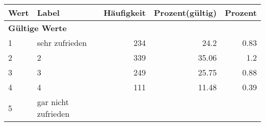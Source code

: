      \begin{longtable}{lXrrr}
     \toprule
     \textbf{Wert} & \textbf{Label} & \textbf{Häufigkeit} & \textbf{Prozent(gültig)} & \textbf{Prozent} \\
     \endhead
     \midrule
     \multicolumn{5}{l}{\textbf{Gültige Werte}}\\

     1 &
     \multicolumn{1}{X}{ sehr zufrieden   } &


       \num{234} &
       \num[round-mode=places,round-precision=2]{24,2} &
         \num[round-mode=places,round-precision=2]{0,83} \\

     2 &
     \multicolumn{1}{X}{ 2   } &


       \num{339} &
       \num[round-mode=places,round-precision=2]{35,06} &
         \num[round-mode=places,round-precision=2]{1,2} \\

     3 &
     \multicolumn{1}{X}{ 3   } &


       \num{249} &
       \num[round-mode=places,round-precision=2]{25,75} &
         \num[round-mode=places,round-precision=2]{0,88} \\

     4 &
     \multicolumn{1}{X}{ 4   } &


       \num{111} &
       \num[round-mode=places,round-precision=2]{11,48} &
         \num[round-mode=places,round-precision=2]{0,39} \\

     5 &
     \multicolumn{1}{X}{ gar nicht zufrieden   } &



\end{longtable}
